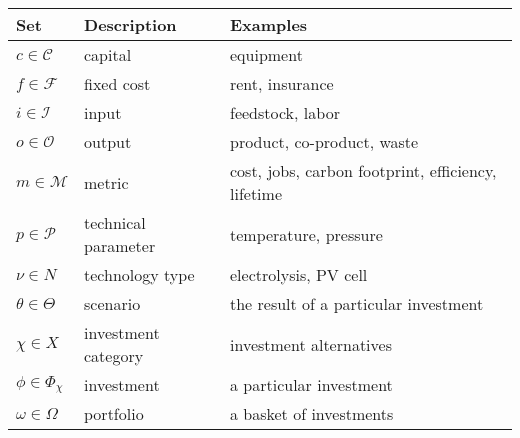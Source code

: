 \documentclass[letterpaper,10pt,english]{sphinxmanual}
\begin{document}
\begin{savenotes}\sphinxattablestart
\centering
{}
\sphinxthecaptionisattop
{}\label{\detokenize{doc-src/formulation:table-1}}\label{\detokenize{doc-src/formulation:tbl-sets}}
\sphinxaftertopcaption
\begin{tabulary}{\linewidth}[t]{|T|T|T|}
\hline
\sphinxstyletheadfamily 
Set
&\sphinxstyletheadfamily 
Description
&\sphinxstyletheadfamily 
Examples
\\
\hline
\(c \in \mathcal{C}\)
&
capital
&
equipment
\\
\hline
\(f \in \mathcal{F}\)
&
fixed cost
&
rent, insurance
\\
\hline
\(i \in \mathcal{I}\)
&
input
&
feedstock, labor
\\
\hline
\(o \in \mathcal{O}\)
&
output
&
product, co-product, waste
\\
\hline
\(m \in \mathcal{M}\)
&
metric
&
cost, jobs, carbon footprint, efficiency, lifetime
\\
\hline
\(p \in \mathcal{P}\)
&
technical parameter
&
temperature, pressure
\\
\hline
\(\nu \in N\)
&
technology type
&
electrolysis, PV cell
\\
\hline
\(\theta \in \Theta\)
&
scenario
&
the result of a particular investment
\\
\hline
\(\chi \in X\)
&
investment category
&
investment alternatives
\\
\hline
\(\phi \in \Phi_\chi\)
&
investment
&
a particular investment
\\
\hline
\(\omega \in \Omega\)
&
portfolio
&
a basket of investments
\\
\hline
\end{tabulary}
\par
\sphinxattableend\end{savenotes}
\end{document}
